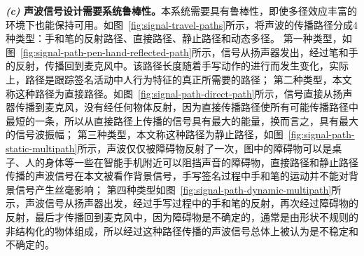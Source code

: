 \textbf{\textit{(c)} 声波信号设计需要系统鲁棒性。}本系统需要具有鲁棒性，即使多径效应丰富的环境下也能保持可用。如图~\ref{fig:signal-travel-paths}所示，将声波的传播路径分成4种类型：手和笔的反射路径、直接路径、静止路径和动态多径。
第一种类型，如图~\ref{fig:signal-path-pen-hand-reflected-path}所示，信号从扬声器发出，经过笔和手的反射，传播回到麦克风中。该路径长度随着手写动作的进行而发生变化，实际上，路径是跟踪签名活动中人行为特征的真正所需要的路径；
第二种类型，本文称这种路径为直接路径。如图~\ref{fig:signal-path-direct-path}所示，信号直接从扬声器传播到麦克风，没有经任何物体反射，因为直接传播路径使所有可能传播路径中最短的一条，所以从直接路径上传播的信号具有最大的能量，换而言之，具有最大的信号波振幅；
第三种类型，本文称这种路径为静止路径，如图~\ref{fig:signal-path-static-multipath}所示，声波仅仅被障碍物反射了一次，图中的障碍物可以是桌子、人的身体等一些在智能手机附近可以阻挡声音的障碍物，直接路径和静止路径传播的声波信号在本文被看作背景信号，手写签名过程中手和笔的运动并不能对背景信号产生丝毫影响；
第四种类型如图~\ref{fig:signal-path-dynamic-multipath}所示，声波信号从扬声器出发，经过手写过程中的手和笔的反射，再次经过障碍物的反射，最后才传播回到麦克风中，因为障碍物是不确定的，通常是由形状不规则的非结构化的物体组成，所以经过这种路径传播的声波信号总体上被认为是不稳定和不确定的。
